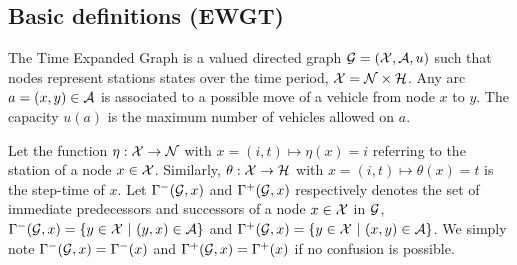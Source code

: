 \begin{bibunit}[ieeetr]
\subsection{Basic definitions (EWGT)}\label{subsec:basic}
The Time Expanded Graph is a valued directed graph ${\cal G}=({\cal X}, {\cal A}, u)$ such that
nodes represent stations states over the time period, \ie ${\cal X}={\cal N}\times {\cal H}$.
Any arc $a=(x,y)\in {\cal A}$ is associated to a possible move of a vehicle from node $x$ to $y$.
The capacity $u(a)$ is the maximum number of vehicles allowed on $a$.

Let the function $\eta:  {{\cal X}  \rightarrow  \cal N}$ with  $x=(i,t) \mapsto \eta(x)=i$ referring to 
the station of a node $x\in {\cal X}$. Similarly, 
$\theta: { {\cal X} \rightarrow  \cal H}$ with $x=(i,t) \mapsto \theta(x)=t$ is the step-time of $x$.
Let $\Gamma^-({\cal G}, x)$ and $\Gamma^+({\cal G},x)$ respectively denotes the set of immediate predecessors and successors of a node $x\in{\cal X}$ in ${\cal G}$, \ie
$\Gamma^-({\cal G}, x)=\{y\in{\cal X}~|~(y,x)\in{\cal A}\}$ and $\Gamma^+({\cal G},x)=\{y\in{\cal X}~|~(x,y)\in{\cal A}\}$.
We simply note $\Gamma^-({\cal G}, x)=\Gamma^-(x)$ and $\Gamma^+({\cal G}, x)=\Gamma^+(x)$ if no confusion is possible.


\end{bibunit}
